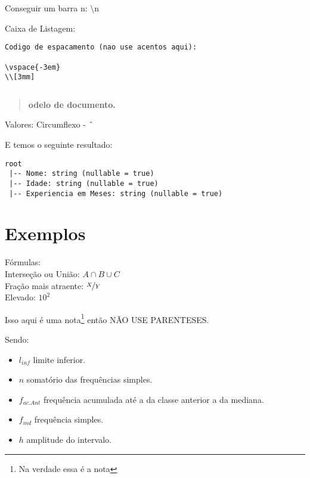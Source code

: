 \documentclass[a4paper,11pt]{article}
\begin{document}
\maketitle %
\thispagestyle{fancy} %

Conseguir um barra n: $\setminus$n

Caixa de Listagem:
\begin{lstlisting}[]
Codigo de espacamento (nao use acentos aqui):

\vspace{-3em}
\\[3mm]
\end{lstlisting}

\begin{lstlisting}[]
\end{lstlisting}

\begin{abstract}
	\textbf{odelo de documento. \lipsum[4-1]}
\end{abstract}

Valores:
Circumflexo - $\string^$

E temos o seguinte resultado: \vspace{-1em}
\begin{verbatim}
root
 |-- Nome: string (nullable = true)
 |-- Idade: string (nullable = true)
 |-- Experiencia em Meses: string (nullable = true)
\end{verbatim}


\section{Exemplos}

Fórmulas: \\
Interseção ou União: $A \cap B \cup C$ \\
Fração mais atraente: $\nicefrac{X}{Y}$ \\
Elevado: $10^2$

Isso aqui é uma nota\footnote{Na verdade essa é a nota} então NÃO USE PARENTESES.

Sendo: \vspace{-1em}
\begin{itemize}[nolistsep]
	\item $l_{inf}$ limite inferior.
	\item $n$ somatório das frequências simples.
	\item $f_{ac.Ant}$ frequência acumulada até a da classe anterior a da mediana.
	\item $f_{md}$ frequência simples.
	\item $h$ amplitude do intervalo.
\end{itemize}
\end{document}
